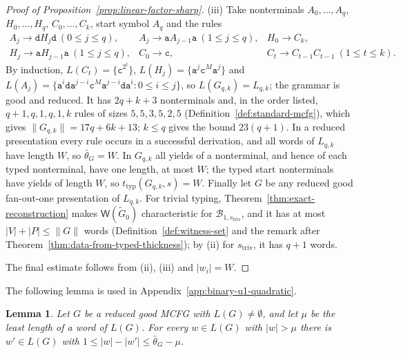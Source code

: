 \documentclass[11pt]{article}
\numberwithin{equation}{section}
\theoremstyle{plain}
\newtheorem{lemma}[theorem]{Lemma}
\theoremstyle{definition}
\theoremstyle{remark}
\newcommand{\Wit}{\mathsf{W}}
\theoremstyle{plain}
\begin{document}
\begin{proof}[Proof of Proposition~\ref{prop:linear-factor-sharp}]
(iii) Take nonterminals $A_0,\ldots,A_q$, $H_0,\ldots,H_q$, $C_0,\ldots,C_k$,
start symbol $A_q$ and the rules
\[
\begin{array}{lll}
 A_j\to\mathtt d H_j\mathtt d\ (0\le j\le q), &
 A_j\to\mathtt a A_{j-1}\mathtt a\ (1\le j\le q), &
 H_0\to C_k,\\
 H_j\to\mathtt a H_{j-1}\mathtt a\ (1\le j\le q), &
 C_0\to\mathtt c, &
 C_t\to C_{t-1}C_{t-1}\ (1\le t\le k).
\end{array}
\]
By induction, $L(C_t)=\{\mathtt c^{2^t}\}$,
$L(H_j)=\{\mathtt a^j\mathtt c^M\mathtt a^j\}$ and
$L(A_j)=\{\mathtt a^i\mathtt d\mathtt a^{j-i}\mathtt c^M\mathtt a^{j-i}
\mathtt d\mathtt a^i:0\le i\le j\}$, so $L(G_{q,k})=L_{q,k}$; the grammar is
good and reduced.  It has $2q+k+3$ nonterminals and, in the order listed,
$q+1,q,1,q,1,k$ rules of sizes $5,5,3,5,2,5$
(Definition~\ref{def:standard-mcfg}), which gives $\|G_{q,k}\|=17q+6k+13$;
$k\le q$ gives the bound $23(q+1)$.  In a reduced presentation every rule
occurs in a successful derivation, and all words of $L_{q,k}$ have length
$W$, so $\bar\theta_G=W$.  In $G_{q,k}$ all yields of a nonterminal, and hence
of each typed nonterminal, have one length, at most $W$; the typed start
nonterminals have yields of length $W$, so $t_{\mathrm{typ}}(G_{q,k},s)=W$.
Finally let $G$ be any reduced good fan-out-one presentation of $L_{q,k}$.
For trivial typing, Theorem~\ref{thm:exact-reconstruction} makes
$\Wit(\widetilde G_0)$ characteristic for $\mathcal B_{1,s_{\mathrm{triv}}}$,
and it has at most $|V|+|P|\le\|G\|$ words
(Definition~\ref{def:witness-set} and the remark after
Theorem~\ref{thm:data-from-typed-thickness}); by (ii) for
$s_{\mathrm{triv}}$, it has $q+1$ words.

The final estimate follows from (ii), (iii) and $|w_i|=W$.
\end{proof}

The following lemma is used in Appendix~\ref{app:binary-u1-quadratic}.

\begin{lemma}\label{lem:app-lf-descent}
Let $G$ be a reduced good MCFG with $L(G)\ne\emptyset$, and let $\mu$ be the least
length of a word of $L(G)$.  For every $w\in L(G)$ with $|w|>\mu$ there is
$w'\in L(G)$ with $1\le|w|-|w'|\le\bar\theta_G-\mu$.
\end{lemma}
\end{document}
